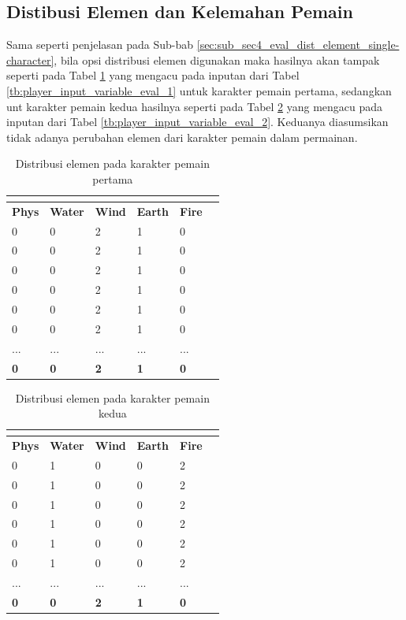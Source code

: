 \subsection{Distibusi Elemen dan Kelemahan Pemain}
\label{sec:sub_sec4_eval_dist_element_multi-character}
\vspace{1ex}

Sama seperti penjelasan pada Sub-bab \ref{sec:sub_sec4_eval_dist_element_single-character}, bila opsi distribusi elemen digunakan maka hasilnya akan tampak seperti pada Tabel \ref{tb:player_element_1} yang mengacu pada inputan dari Tabel \ref{tb:player_input_variable_eval_1} untuk karakter pemain pertama, sedangkan unt karakter pemain kedua hasilnya seperti pada Tabel \ref{tb:player_element_2} yang mengacu pada inputan dari Tabel \ref{tb:player_input_variable_eval_2}. Keduanya diasumsikan tidak adanya perubahan elemen dari karakter pemain dalam permainan.
\vspace{-1ex}

\begin{longtable}{|l|l|l|l|l|l|}
	\caption{Distribusi elemen pada karakter pemain pertama}
	\vspace{1ex}
	\label{tb:player_element_1}\\
	\hline
	\rowcolor[HTML]{C0C0C0} 
	\textbf{Phys} & \textbf{Water} & \textbf{Wind} & \textbf{Earth} & \textbf{Fire} \\ \hline
	0 & 0 & 2 & 1 & 0 \\ \hline
	0 & 0 & 2 & 1 & 0 \\ \hline
	0 & 0 & 2 & 1 & 0 \\ \hline
	0 & 0 & 2 & 1 & 0 \\ \hline
	0 & 0 & 2 & 1 & 0 \\ \hline
	0 & 0 & 2 & 1 & 0 \\ \hline
	... & ... & ... & ... & ... \\ \hline
	\textbf{0} & \textbf{0} & \textbf{2} & \textbf{1} & \textbf{0} \\ \hline
\end{longtable}
\vspace{-1ex}

\begin{longtable}{|l|l|l|l|l|l|}
	\caption{Distribusi elemen pada karakter pemain kedua}
	\vspace{1ex}
	\label{tb:player_element_2}\\
	\hline
	\rowcolor[HTML]{C0C0C0} 
	\textbf{Phys} & \textbf{Water} & \textbf{Wind} & \textbf{Earth} & \textbf{Fire} \\ \hline
	0 & 1 & 0 & 0 & 2 \\ \hline
	0 & 1 & 0 & 0 & 2 \\ \hline
	0 & 1 & 0 & 0 & 2 \\ \hline
	0 & 1 & 0 & 0 & 2 \\ \hline
	0 & 1 & 0 & 0 & 2 \\ \hline
	0 & 1 & 0 & 0 & 2 \\ \hline
	... & ... & ... & ... & ... \\ \hline
	\textbf{0} & \textbf{0} & \textbf{2} & \textbf{1} & \textbf{0} \\ \hline
\end{longtable}
\vspace{1ex}

